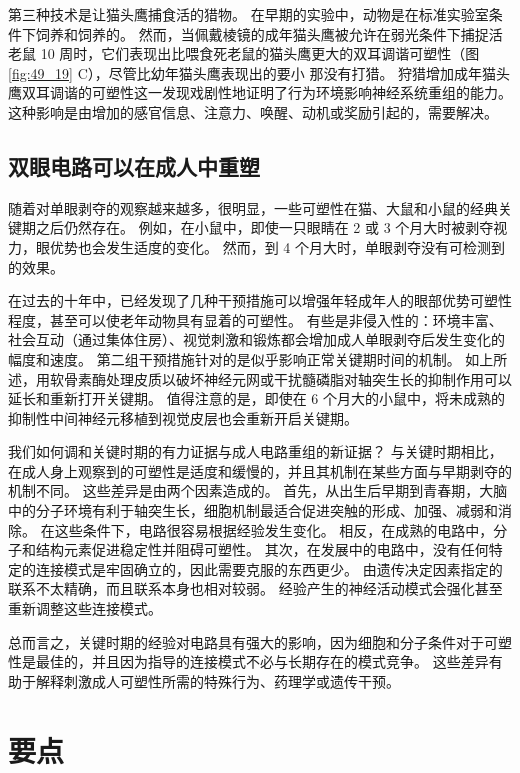 第三种技术是让猫头鹰捕食活的猎物。
在早期的实验中，动物是在标准实验室条件下饲养和饲养的。
然而，当佩戴棱镜的成年猫头鹰被允许在弱光条件下捕捉活老鼠 10 周时，它们表现出比喂食死老鼠的猫头鹰更大的双耳调谐可塑性（图 \ref{fig:49_19} C），尽管比幼年猫头鹰表现出的要小 那没有打猎。
狩猎增加成年猫头鹰双耳调谐的可塑性这一发现戏剧性地证明了行为环境影响神经系统重组的能力。
这种影响是由增加的感官信息、注意力、唤醒、动机或奖励引起的，需要解决。



\subsection{双眼电路可以在成人中重塑}

随着对单眼剥夺的观察越来越多，很明显，一些可塑性在猫、大鼠和小鼠的经典关键期之后仍然存在。
例如，在小鼠中，即使一只眼睛在 2 或 3 个月大时被剥夺视力，眼优势也会发生适度的变化。
然而，到 4 个月大时，单眼剥夺没有可检测到的效果。


在过去的十年中，已经发现了几种干预措施可以增强年轻成年人的眼部优势可塑性程度，甚至可以使老年动物具有显着的可塑性。
有些是非侵入性的：环境丰富、社会互动（通过集体住房）、视觉刺激和锻炼都会增加成人单眼剥夺后发生变化的幅度和速度。
第二组干预措施针对的是似乎影响正常关键期时间的机制。
如上所述，用软骨素酶处理皮质以破坏神经元网或干扰髓磷脂对轴突生长的抑制作用可以延长和重新打开关键期。
值得注意的是，即使在 6 个月大的小鼠中，将未成熟的抑制性中间神经元移植到视觉皮层也会重新开启关键期。


我们如何调和关键时期的有力证据与成人电路重组的新证据？
与关键时期相比，在成人身上观察到的可塑性是适度和缓慢的，并且其机制在某些方面与早期剥夺的机制不同。
这些差异是由两个因素造成的。
首先，从出生后早期到青春期，大脑中的分子环境有利于轴突生长，细胞机制最适合促进突触的形成、加强、减弱和消除。
在这些条件下，电路很容易根据经验发生变化。
相反，在成熟的电路中，分子和结构元素促进稳定性并阻碍可塑性。
其次，在发展中的电路中，没有任何特定的连接模式是牢固确立的，因此需要克服的东西更少。
由遗传决定因素指定的联系不太精确，而且联系本身也相对较弱。
经验产生的神经活动模式会强化甚至重新调整这些连接模式。


总而言之，关键时期的经验对电路具有强大的影响，因为细胞和分子条件对于可塑性是最佳的，并且因为指导的连接模式不必与长期存在的模式竞争。
这些差异有助于解释刺激成人可塑性所需的特殊行为、药理学或遗传干预。



\section{要点}

